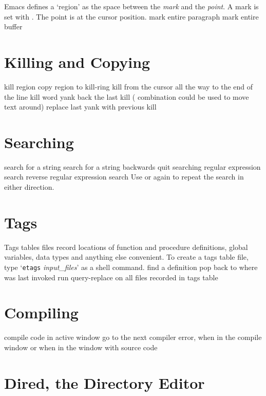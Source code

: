 Emacs defines a `region' as the space between the {\it mark\/} and
the {\it point}.  A mark is set with .
The point is at the cursor position.
\askip
{} mark entire paragraph
 mark entire buffer

\section{Killing and Copying}

 kill region
 copy region to kill-ring
 kill from the cursor all the way to the end of the line
 kill word
 yank back the last kill ( combination could be
  used to move text around)
 replace last yank with previous kill

\section{Searching}

 search for a string
 search for a string backwards
 quit searching
 regular expression search
 reverse regular expression search
\askip
Use  or  again to repeat the search in either direction.

\section{Tags}

Tags tables files record locations of function and
procedure definitions, global variables, data types and anything
else convenient.  To create a tags table file, type
`{\tt etags} {\it input\_files}' as a shell command.
\askip
{} find a definition
 pop back to where  was last invoked
 run query-replace on all files
  recorded in tags table

\section{Compiling}

 compile code in active window
 go to the next compiler error, when in
  the compile window or
 when in the window with source code

\section{Dired, the Directory Editor}

